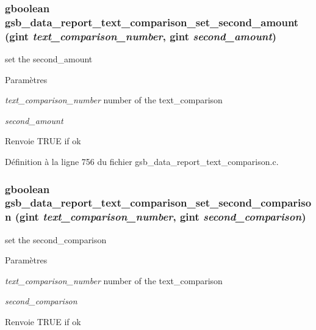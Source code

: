 \subsubsection[{gsb\_\-data\_\-report\_\-text\_\-comparison\_\-set\_\-second\_\-amount}]{\setlength{\rightskip}{0pt plus 5cm}gboolean gsb\_\-data\_\-report\_\-text\_\-comparison\_\-set\_\-second\_\-amount (gint {\em text\_\-comparison\_\-number}, \/  gint {\em second\_\-amount})}\label{gsb__data__report__text__comparison_8c_a76aabed5bda5d92ddd0e4a8fc43ab208}
set the second\_\-amount


\begin{DoxyParams}{Paramètres}
\item[{\em text\_\-comparison\_\-number}]number of the text\_\-comparison \item[{\em second\_\-amount}]\end{DoxyParams}
\begin{DoxyReturn}{Renvoie}
TRUE if ok 
\end{DoxyReturn}


Définition à la ligne 756 du fichier gsb\_\-data\_\-report\_\-text\_\-comparison.c.

\subsubsection[{gsb\_\-data\_\-report\_\-text\_\-comparison\_\-set\_\-second\_\-comparison}]{\setlength{\rightskip}{0pt plus 5cm}gboolean gsb\_\-data\_\-report\_\-text\_\-comparison\_\-set\_\-second\_\-comparison (gint {\em text\_\-comparison\_\-number}, \/  gint {\em second\_\-comparison})}\label{gsb__data__report__text__comparison_8c_a864d1f692a587270130597a4e46160c6}
set the second\_\-comparison


\begin{DoxyParams}{Paramètres}
\item[{\em text\_\-comparison\_\-number}]number of the text\_\-comparison \item[{\em second\_\-comparison}]\end{DoxyParams}
\begin{DoxyReturn}{Renvoie}
TRUE if ok 
\end{DoxyReturn}


